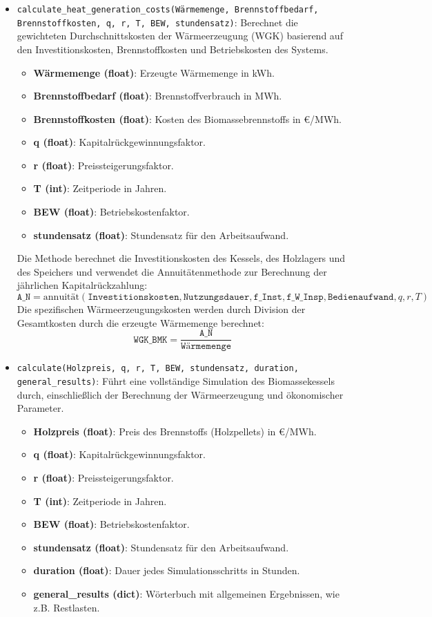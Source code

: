 \begin{itemize}
    \item \texttt{calculate\_heat\_generation\_costs(Wärmemenge, Brennstoffbedarf, Brennstoffkosten, q, r, T, BEW, stundensatz)}: Berechnet die gewichteten Durchschnittskosten der Wärmeerzeugung (WGK) basierend auf den Investitionskosten, Brennstoffkosten und Betriebskosten des Systems.
    \begin{itemize}
        \item \textbf{Wärmemenge (float)}: Erzeugte Wärmemenge in kWh.
        \item \textbf{Brennstoffbedarf (float)}: Brennstoffverbrauch in MWh.
        \item \textbf{Brennstoffkosten (float)}: Kosten des Biomassebrennstoffs in €/MWh.
        \item \textbf{q (float)}: Kapitalrückgewinnungsfaktor.
        \item \textbf{r (float)}: Preissteigerungsfaktor.
        \item \textbf{T (int)}: Zeitperiode in Jahren.
        \item \textbf{BEW (float)}: Betriebskostenfaktor.
        \item \textbf{stundensatz (float)}: Stundensatz für den Arbeitsaufwand.
    \end{itemize}
    
    Die Methode berechnet die Investitionskosten des Kessels, des Holzlagers und des Speichers und verwendet die Annuitätenmethode zur Berechnung der jährlichen Kapitalrückzahlung:
    \[
    \texttt{A\_N} = \text{annuität}(\texttt{Investitionskosten}, \texttt{Nutzungsdauer}, \texttt{f\_Inst}, \texttt{f\_W\_Insp}, \texttt{Bedienaufwand}, q, r, T)
    \]
    Die spezifischen Wärmeerzeugungskosten werden durch Division der Gesamtkosten durch die erzeugte Wärmemenge berechnet:
    \[
    \texttt{WGK\_BMK} = \frac{\texttt{A\_N}}{\texttt{Wärmemenge}}
    \]

    \item \texttt{calculate(Holzpreis, q, r, T, BEW, stundensatz, duration, general\_results)}: Führt eine vollständige Simulation des Biomassekessels durch, einschließlich der Berechnung der Wärmeerzeugung und ökonomischer Parameter.
    \begin{itemize}
        \item \textbf{Holzpreis (float)}: Preis des Brennstoffs (Holzpellets) in €/MWh.
        \item \textbf{q (float)}: Kapitalrückgewinnungsfaktor.
        \item \textbf{r (float)}: Preissteigerungsfaktor.
        \item \textbf{T (int)}: Zeitperiode in Jahren.
        \item \textbf{BEW (float)}: Betriebskostenfaktor.
        \item \textbf{stundensatz (float)}: Stundensatz für den Arbeitsaufwand.
        \item \textbf{duration (float)}: Dauer jedes Simulationsschritts in Stunden.
        \item \textbf{general\_results (dict)}: Wörterbuch mit allgemeinen Ergebnissen, wie z.B. Restlasten.
    \end{itemize}
    

\end{itemize}
